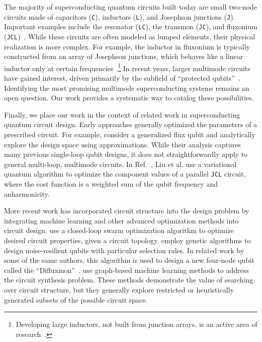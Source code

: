 The majority of superconducting quantum circuits built today are small two-node circuits made of capacitors (\verb|C|), inductors (\verb|L|), and Josephson junctions (\verb|J|). Important examples include the resonator (\verb|LC|), the transmon (\verb|JC|), and fluxonium (\verb|JCL|)~\cite{manucharyanFluxoniumSingleCooperPair2009a,somoroff2023}. While these circuits are often modeled as lumped elements, their physical realization is more complex. For example, the inductor in fluxonium is typically constructed from an array of Josephson junctions, which behaves like a linear inductor only at certain frequencies \cite{manucharyan_thesis:2012}.\footnote{Developing large inductors, not built from junction arrays, is an active area of research~\cite{grunhaupt_granular_2019, peruzzo_surpassing_2020, gupta_low_2024}.} In recent years, larger multimode circuits have gained interest, driven primarily by the subfield of ``protected qubits''~\cite{gyenisMovingTransmonNoiseProtected2021b}. Identifying the most promising multimode superconducting systems remains an open question. Our work provides a systematic way to catalog these possibilities.

Finally, we place our work in the context of related work in superconducting quantum circuit design. Early approaches generally optimized the parameters of a prescribed circuit. For example, \citet{YanSungOliver:2020} consider a generalized flux qubit and analytically explore the design space using approximations. While their analysis captures many previous single-loop qubit designs, it does not straightforwardly apply to general multi-loop, multimode circuits. In Ref.~\cite{LiuWangPan:2023}, Liu et al. use a variational quantum algorithm to optimize the component values of a parallel \texttt{JCL} circuit, where the cost function is a weighted sum of the qubit frequency and anharmonicity.

More recent work has incorporated circuit structure into the design problem by integrating machine learning and other advanced optimization methods into circuit design. \citet{Menke:2021aa} use a closed-loop swarm optimization algorithm to optimize desired circuit properties, given a circuit topology. \citet{CardLopeSanz2023} employ genetic algorithms to design noise-resilient qubits with particular selection rules. In related work by some of the same authors, this algorithm is used to design a new four-node qubit called the ``Difluxmon''~\cite{garcia-azorin_2024}. \citet{GraphQ_PrincetonMM_2024} use graph-based machine learning methods to address the circuit synthesis problem. These methods demonstrate the value of searching over circuit structure, but they generally explore restricted or heuristically generated subsets of the possible circuit space.

